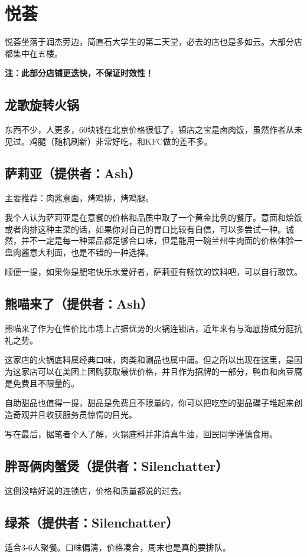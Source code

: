 \documentclass[lang=cn,color=blue,12pt,scheme=chinese,chinesefont=nofont]{elegantbook}
\begin{document}
\section{悦荟}
\setlength{\parindent}{2em}
悦荟坐落于润杰旁边，简直石大学生的第二天堂，必去的店也是多如云。大部分店都集中在五楼。

\textbf{注：此部分店铺更迭快，不保证时效性！}

\subsection{龙歌旋转火锅}
东西不少，人更多，60块钱在北京价格很低了，镇店之宝是卤肉饭，虽然作者从未见过。鸡腿（随机刷新）非常好吃，和KFC做的差不多。

\subsection{萨莉亚（提供者：Ash）}
主要推荐：肉酱意面，烤鸡排，烤鸡腿。

我个人认为萨莉亚是在意餐的价格和品质中取了一个黄金比例的餐厅。意面和烩饭或者肉排这种主菜的话，如果你对自己的胃口比较有自信，可以多尝试一种。诚然，并不一定是每一种菜品都足够合口味，但是能用一碗兰州牛肉面的价格体验一盘肉酱意大利面，也是不错的一种选择。

顺便一提，如果你是肥宅快乐水爱好者，萨莉亚有畅饮的饮料吧，可以自行取饮。

\subsection{熊喵来了（提供者：Ash）}
熊喵来了作为在性价比市场上占据优势的火锅连锁店，近年来有与海底捞成分庭抗礼之势。

这家店的火锅底料属经典口味，肉类和涮品也属中庸。但之所以出现在这里，是因为这家店可以在美团上团购获取最优价格，并且作为招牌的一部分，鸭血和卤豆腐是免费且不限量的。

自助甜品也值得一提，甜品是免费且不限量的，你可以把吃空的甜品碟子堆起来创造奇观并且收获服务员惊愕的目光。

写在最后，据笔者个人了解，火锅底料并非清真牛油，回民同学谨慎食用。

\subsection{胖哥俩肉蟹煲（提供者：Silenchatter）}
这倒没啥好说的连锁店，价格和质量都说的过去。

\subsection{绿茶（提供者：Silenchatter）}
适合3-6人聚餐。口味偏清，价格凑合，周末也是真的要排队。
\end{document}
